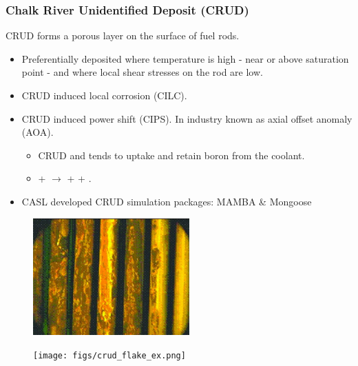 \documentclass[t, pdftex]{beamer}
\begin{document}
\begin{frame}[shrink=10]
    \frametitle{Chalk River Unidentified Deposit (CRUD)}
    CRUD forms a porous layer on the surface of fuel rods.
    \begin{itemize}
    \item Preferentially deposited where temperature is high - near or above saturation point - and where local shear stresses on the rod are low.
	\item CRUD induced local corrosion (CILC).
    \item CRUD induced power shift (CIPS). In industry known as axial offset anomaly (AOA).
    \begin{itemize} 
    	\item CRUD and tends to uptake and retain boron from the coolant.
    	\item {} +    $\rightarrow$  +  +  .
    \end{itemize}
    \item CASL developed CRUD simulation packages: MAMBA \& Mongoose
    \end{itemize}
%
    \begin{figure}
        \centering
        \begin{minipage}{.7\textwidth}
            \centering
            \includegraphics[width=6cm]{figs/crud-crud.jpg}
        \end{minipage}%
        \begin{minipage}{.4\textwidth}
            \centering
            \texttt{[image: figs/crud\_flake\_ex.png]}
        \end{minipage}
    \end{figure}
\end{frame}
\end{document}
